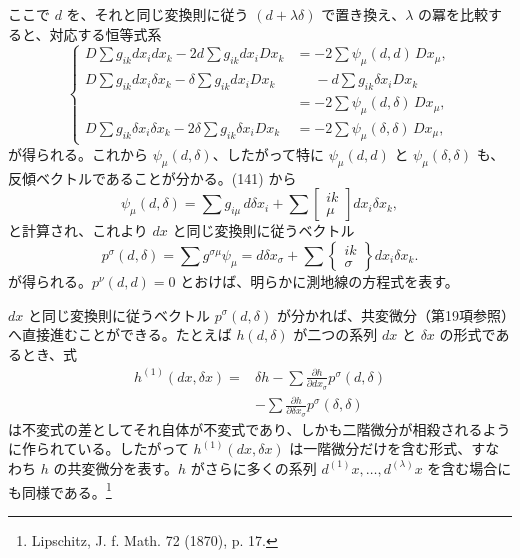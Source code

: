 \documentclass[11pt]{article}
\begin{document}
ここで $d$ を、それと同じ変換則に従う $(d+\lambda\delta)$ で置き換え、$\lambda$ の冪を比較すると、対応する恒等式系
\begin{equation}
\left\{
\begin{aligned}
D\sum g_{ik}dx_i dx_k-2d\sum g_{ik}dx_iDx_k
   &=-2\sum\psi_\mu(d,d)\,Dx_\mu,\\
D\sum g_{ik}dx_i\delta x_k-\delta\sum g_{ik}dx_iDx_k
   &\phantom{={}}{}-d\sum g_{ik}\delta x_iDx_k\\
   &=-2\sum\psi_\mu(d,\delta)\,Dx_\mu,\\
D\sum g_{ik}\delta x_i\delta x_k-2\delta\sum g_{ik}\delta x_iDx_k
   &=-2\sum\psi_\mu(\delta,\delta)\,Dx_\mu,
\end{aligned}
\right.
\tag{141}
\end{equation}
が得られる。これから $\psi_\mu(d,\delta)$、したがって特に $\psi_\mu(d,d)$ と $\psi_\mu(\delta,\delta)$ も、反傾ベクトルであることが分かる。(141) から
\[
\psi_\mu(d,\delta)=\sum g_{i\mu}\,d\delta x_i+
\sum\left[\begin{smallmatrix}ik\\ \mu\end{smallmatrix}\right]dx_i\delta x_k,
\]
と計算され、これより $dx$ と同じ変換則に従うベクトル
\begin{equation}
p^\sigma(d,\delta)=\sum g^{\sigma\mu}\psi_\mu
=d\delta x_\sigma+
\sum\left\{\begin{smallmatrix}ik\\ \sigma\end{smallmatrix}\right\}dx_i\delta x_k.
\tag{142}
\end{equation}
が得られる。$p^\nu(d,d)=0$ とおけば、明らかに測地線の方程式を表す。

$dx$ と同じ変換則に従うベクトル $p^\sigma(d,\delta)$ が分かれば、共変微分（第19項参照）へ直接進むことができる。たとえば $h(d,\delta)$ が二つの系列 $dx$ と $\delta x$ の形式であるとき、式
\begin{equation}
\begin{aligned}
h^{(1)}(dx,\delta x)={}&\delta h-
\sum\frac{\partial h}{\partial dx_\sigma}p^\sigma(d,\delta)\\
&-\sum\frac{\partial h}{\partial \delta x_\sigma}p^\sigma(\delta,\delta)
\end{aligned}
\tag{143}
\end{equation}
は不変式の差としてそれ自体が不変式であり、しかも二階微分が相殺されるように作られている。したがって $h^{(1)}(dx,\delta x)$ は一階微分だけを含む形式、すなわち $h$ の共変微分を表す。$h$ がさらに多くの系列 $d^{(1)}x,\ldots,d^{(\lambda)}x$ を含む場合にも同様である。\footnote{Lipschitz, J. f. Math. 72 (1870), p. 17.}
\end{document}

